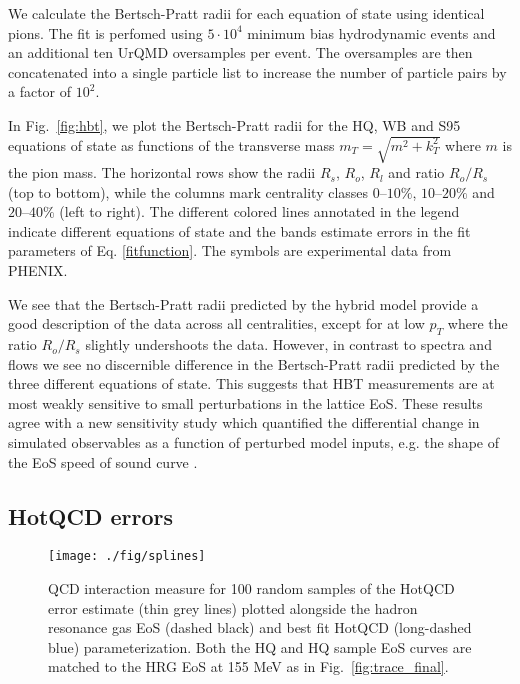 \documentclass[aps,prc,reprint,amsmath,nofootinbib,superscriptaddress]{revtex4-1}
\begin{document}
We calculate the Bertsch-Pratt radii for each equation of state using identical pions. The fit is perfomed using $5\cdot10^4$ minimum bias hydrodynamic events and an additional ten UrQMD oversamples per event. The oversamples are then concatenated into a single particle list to increase the number of particle pairs by a factor of $10^2$.

In Fig.~\ref{fig:hbt}, we plot the Bertsch-Pratt radii for the HQ, WB and S95 equations of state as functions of the transverse mass $m_T = \sqrt{m^2 + k_T^2}$ where $m$ is the pion mass. The horizontal rows show the radii $R_s$, $R_o$, $R_l$ and ratio $R_o/R_s$ (top to bottom), while the columns mark centrality classes $0$--$10\%$, $10$--$20\%$ and $20$--$40\%$ (left to right). The different colored lines annotated in the legend indicate different equations of state and the bands estimate errors in the fit parameters of Eq. \eqref{fitfunction}. The symbols are experimental data from PHENIX.

We see that the Bertsch-Pratt radii predicted by the hybrid model provide a good description of the data across all centralities, except for at low $p_T$ where the ratio $R_o/R_s$ slightly undershoots the data. However, in contrast to spectra and flows we see no discernible difference in the Bertsch-Pratt radii predicted by the three different equations of state. This suggests
that HBT measurements are at most weakly sensitive to small perturbations in the lattice EoS. These results agree with a new sensitivity study which quantified the differential change in simulated observables as a function of perturbed model inputs, e.g. the shape of the EoS speed of sound curve \cite{Sangaline:2015isa}. 

\subsection{HotQCD errors}
\label{errors}

\begin{figure}[t]
  \texttt{[image: ./fig/splines]}
  \caption{
    \label{fig:splines}
    QCD interaction measure for 100 random samples of the HotQCD error estimate (thin grey lines) plotted alongside the hadron resonance gas EoS (dashed black) and 
    best fit HotQCD (long-dashed blue) parameterization. Both the HQ and HQ sample EoS curves are matched to the HRG EoS at 155 MeV as in Fig.~\ref{fig:trace_final}.
  }
\end{figure}
\end{document}
